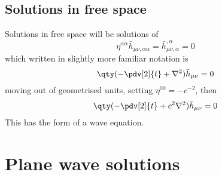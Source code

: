 \subsection{Solutions in free space}
\label{sec:solutions-free-space}

Solutions in free space will be solutions of 
\begin{equation}
  \label{eq:14}
   \eta^{\alpha \alpha } \bar{h}_{\mu \nu, \alpha \alpha} = \bar{h}_{\mu \nu, \alpha}^{,\alpha} = 0
\end{equation}
which written in slightly more familiar notation is
\begin{equation}
  \label{eq:15}
  \qty( - \pdv[2]{t} + \nabla^2 ) \bar{h}_{\mu \nu} = 0
\end{equation}
moving out of geometrised units, setting $\eta^{00} = -c^{-2}$, then
\begin{equation}
  \label{eq:16}
   \qty( - \pdv[2]{t} + c^2\nabla^2 ) \bar{h}_{\mu \nu} = 0
\end{equation}
This has the form of a wave equation.

\section{Plane wave solutions}
\label{sec:plane-wave-solutions}

